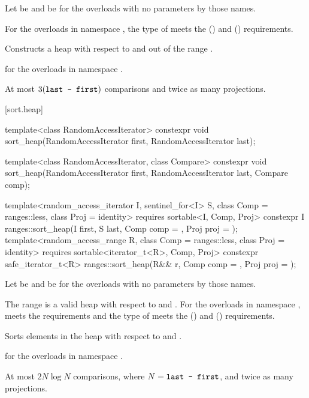 \begin{itemdescr}
\pnum
Let  be 
and  be 
for the overloads with no parameters by those names.

\pnum
\expects
For the overloads in namespace ,
the type of  meets
the  () and
 () requirements.

\pnum
\effects
Constructs a heap with respect to  and 
out of the range .

\pnum
\returns
{} for the overloads in namespace .

\pnum
\complexity
At most $3(\texttt{last - first})$ comparisons and twice as many projections.
\end{itemdescr}

[sort.heap]{}

%
\begin{itemdecl}
template<class RandomAccessIterator>
  constexpr void sort_heap(RandomAccessIterator first, RandomAccessIterator last);

template<class RandomAccessIterator, class Compare>
  constexpr void sort_heap(RandomAccessIterator first, RandomAccessIterator last,
                           Compare comp);

template<random_access_iterator I, sentinel_for<I> S, class Comp = ranges::less,
         class Proj = identity>
  requires sortable<I, Comp, Proj>
  constexpr I
    ranges::sort_heap(I first, S last, Comp comp = {}, Proj proj = {});
template<random_access_range R, class Comp = ranges::less, class Proj = identity>
  requires sortable<iterator_t<R>, Comp, Proj>
  constexpr safe_iterator_t<R>
    ranges::sort_heap(R&& r, Comp comp = {}, Proj proj = {});
\end{itemdecl}

\begin{itemdescr}
\pnum
Let  be 
and  be 
for the overloads with no parameters by those names.

\pnum
\expects
The range  is
a valid heap with respect to  and .
For the overloads in namespace ,
 meets
the  requirements and
the type of  meets
the  () and
 () requirements.

\pnum
\effects
Sorts elements in the heap 
with respect to  and .

\pnum
\returns
{} for the overloads in namespace .

\pnum
\complexity
At most $2N \log N$ comparisons, where $N = \texttt{last - first}$, and
twice as many projections.
\end{itemdescr}

